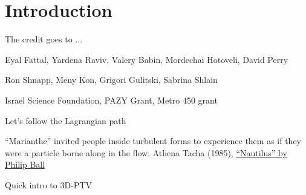 \documentclass[aspectratio=43]{beamer}
\begin{document}
\section{Introduction}
\begin{frame}{The credit goes to ... }
\begin{multicols}{2}
\centering
{} 
\end{multicols}
\end{frame}
%
\begin{frame}
\begin{card}
Eyal Fattal, Yardena Raviv, Valery Babin, Mordechai Hotoveli, David Perry
\end{card}
\begin{card}[TAU]
Ron Shnapp, Meny Kon, Grigori Gulitski, Sabrina Shlain
\end{card}
\begin{card}[Funding]
Israel Science Foundation, PAZY Grant, Metro 450 grant
\end{card}
\end{frame}
%
%
%
\begin{frame}{Let's follow the Lagrangian path}
\centering{}
\vspace{-.3cm}
\begin{cardTiny}
``Marianthe'' invited people inside turbulent forms to experience them as
if they were a particle borne along in the flow. Athena
Tacha (1985), \href{http://nautil.us/issue/15/turbulence/the-scientific-problem-that-must-be-experienced}{``Nautilus'' by Philip Ball}
\end{cardTiny}
\end{frame}
%



\begin{frame}{Quick intro to 3D-PTV}
\centering{}
\end{frame}
\end{document}
